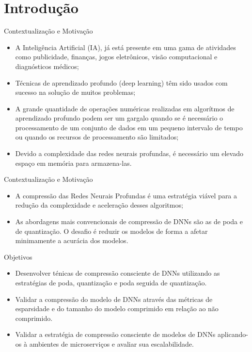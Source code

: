 \section{Introdução}
\begin{frame}{Contextualização e Motivação}
    \begin{flushleft}
	\begin{itemize}
	
	    \item A Inteligência Artificial (IA), já está presente em uma gama de atividades como publicidade, finanças, jogos eletrônicos, visão computacional e diagnósticos médicos;
        \item Técnicas de aprendizado profundo (deep learning) têm sido usados com sucesso na solução de muitos problemas;
        \item A grande quantidade de operações numéricas realizadas em algorítmos de aprendizado profundo podem ser um gargalo quando se é necessário o processamento de um conjunto de dados em um pequeno intervalo de tempo ou quando os recursos de processamento são limitados;
        \item Devido a complexidade das redes neurais profundas, é necessário um elevado espaço em memória para armazena-las.
    \end{itemize}
    \end{flushleft}
\end{frame}

\begin{frame}{Contextualização e Motivação}
    \begin{flushleft}
    	\begin{itemize}
	
	    \item A compressão das Redes Neurais Profundas é uma estratégia viável para a redução da complexidade e aceleração desses algoritmos;
        \item As abordagens mais convencionais de compressão de DNNs são as de poda e de quantização. O desafio é reduzir os modelos de forma a afetar minimamente a acurácia dos modelos.
    \end{itemize}
    \end{flushleft}
\end{frame}


\begin{frame}{Objetivos}
	\begin{itemize}
        \item Desenvolver ténicas de compressão consciente de DNNs utilizando as estratégias de poda, quantização e poda seguida de quantização.
        \item Validar a compressão do modelo de DNNs através das métricas de esparsidade e do tamanho do modelo comprimido em relação ao não comprimido.
        \item Validar a estratégia de compressão consciente de modelos de DNNs aplicando-os à ambientes de microserviços e avaliar sua escalabilidade.
    \end{itemize}
\end{frame}
